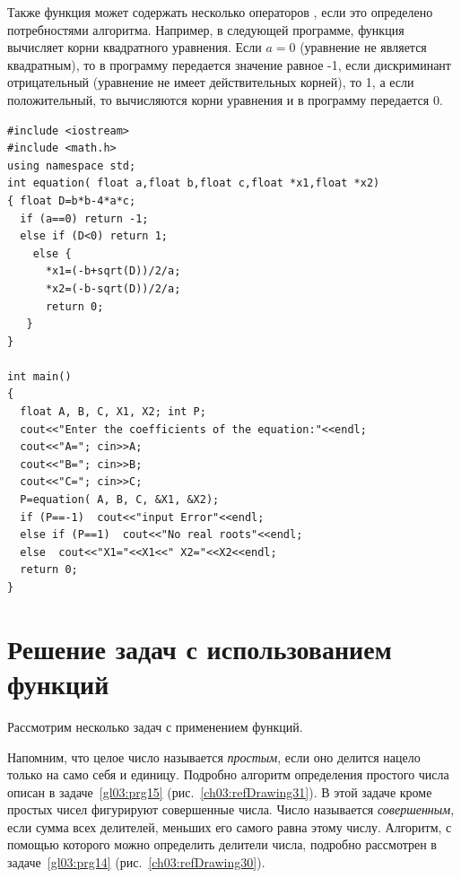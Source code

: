 Также функция может содержать несколько операторов , если это определено потребностями
алгоритма. Например, в следующей программе, функция  вычисляет корни квадратного уравнения.
Если $a=0$ (уравнение не является квадратным), то в программу передается значение равное
-1, если дискриминант отрицательный (уравнение не имеет действительных корней), то
1, а если положительный, то  вычисляются корни уравнения и в программу передается 0.
\begin{lstlisting}
#include <iostream>
#include <math.h>
using namespace std;
int equation( float a,float b,float c,float *x1,float *x2)
{ float D=b*b-4*a*c;
  if (a==0) return -1;
  else if (D<0) return 1;
    else {
      *x1=(-b+sqrt(D))/2/a;
      *x2=(-b-sqrt(D))/2/a;
      return 0;
   }
}

int main()
{
  float A, B, C, X1, X2; int P;
  cout<<"Enter the coefficients of the equation:"<<endl;
  cout<<"A="; cin>>A;
  cout<<"B="; cin>>B;
  cout<<"C="; cin>>C;
  P=equation( A, B, C, &X1, &X2);
  if (P==-1)  cout<<"input Error"<<endl;
  else if (P==1)  cout<<"No real roots"<<endl;
  else  cout<<"X1="<<X1<<" X2="<<X2<<endl;
  return 0;
}
\end{lstlisting}

\section[Решение задач с использованием функций]{Решение задач с использованием функций}
Рассмотрим несколько задач с применением функций.


Напомним, что целое число называется \emph{простым}, если оно делится нацело только на само себя и единицу.
Подробно алгоритм определения простого числа описан в задаче~\ref{gl03:prg15} (рис.~\ref{ch03:refDrawing31}). 
В этой задаче кроме простых чисел
фигурируют совершенные числа. Число называется \emph{совершенным}, если сумма всех делителей, меньших его
самого равна этому числу. Алгоритм, с помощью которого можно определить делители числа, подробно рассмотрен 
в задаче~\ref{gl03:prg14} (рис.~\ref{ch03:refDrawing30}).

